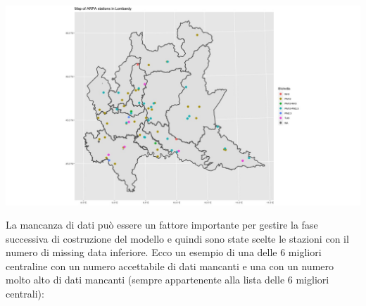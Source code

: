 \documentclass{article}
\begin{document}
\includegraphics[scale=0.35]{Picture/mappina.jpeg}

La mancanza di dati può essere un fattore importante per gestire la fase successiva di 
costruzione del modello
e quindi sono state scelte le stazioni con il numero di missing data inferiore.
Ecco un esempio di una  delle 6 migliori centraline con un numero accettabile di dati mancanti e una con
un numero molto alto di dati mancanti (sempre appartenente alla lista delle 6 migliori centrali):
\end{document}
